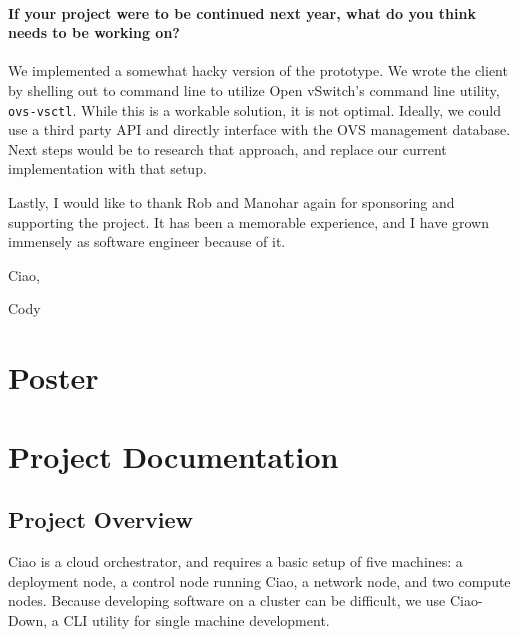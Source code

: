 \documentclass[10pt,onecolumn,journal,draftclsnofoot]{IEEEtran}
\begin{document}
\paragraph{If your project were to be continued next year, what do you think
  needs to be working on?}

We implemented a somewhat hacky version of the prototype. We wrote the
client by shelling out to command line to utilize Open vSwitch's command
line utility, \lstinline!ovs-vsctl!. While this is a workable solution,
it is not optimal. Ideally, we could use a third party API and directly
interface with the OVS management database. Next steps would be to
research that approach, and replace our current implementation with that
setup.

Lastly, I would like to thank Rob and Manohar again for sponsoring and
supporting the project. It has been a memorable experience, and I have
grown immensely as software engineer because of it.

Ciao,

Cody

\section{Poster}


\section{Project Documentation}
\subsection{Project Overview}
Ciao is a cloud orchestrator, and requires a basic setup of five machines: a deployment node, a control node running Ciao, a network node, and two compute nodes. Because developing software on a cluster can be difficult, we use Ciao-Down, a CLI utility for single machine development.
\end{document}
